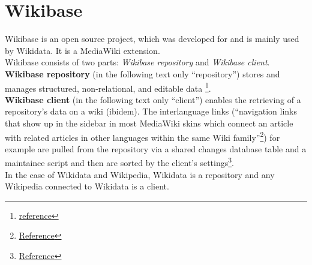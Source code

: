 \section{Wikibase}
Wikibase is an open source project, which was developed for and is mainly used by Wikidata. It is a MediaWiki extension. \\
Wikibase consists of two parts: \textit{Wikibase repository} and \textit{Wikibase client}. \textbf{Wikibase repository} (in the following text only ``repository'')  stores and manages structured, non-relational, and editable data \footnote{\href{http://wikiba.se/}{reference}}. \\
\textbf{Wikibase client} (in the following text only ``client'') enables the retrieving of a repository's data on a wiki (ibidem). The interlanguage links (``navigation links that show up in the sidebar in most MediaWiki skins which connect an article with related articles in other languages within the same Wiki family''\footnote{\href{https://www.mediawiki.org/wiki/Interlanguage_links}{Reference}}) for example are pulled from the repository via a shared changes database table and a maintaince script and then are sorted by the client's settings\footnote{\href{https://www.mediawiki.org/wiki/Extension:Wikibase_Client}{Reference}}. \\
In the case of Wikidata and Wikipedia, Wikidata is a repository and any Wikipedia connected to Wikidata is a client.